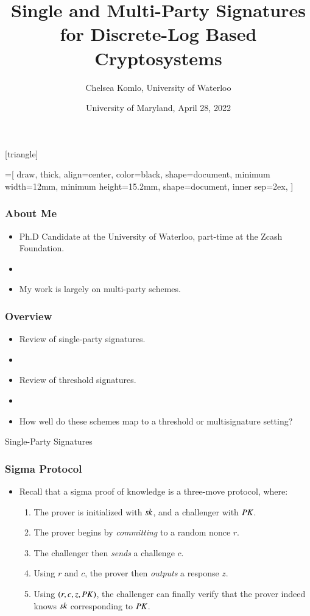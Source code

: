 \documentclass[hyperref={pdfpagelabels=true},table,dvipsnames,14pt,aspectratio=169]{beamer}
\title[Signatures for Discrete Logarithm Based Cryptosystems]{Single and Multi-Party Signatures for Discrete-Log Based Cryptosystems}
\author{Chelsea Komlo, University of Waterloo}
\date[April 2022]{ University of Maryland, April 28, 2022}
\begin{document}
[triangle]

=[%
draw,
thick,
align=center,
color=black,
shape=document,
minimum width=12mm,
minimum height=15.2mm,
shape=document,
inner sep=2ex,
]

\begin{frame}
        \thispagestyle{empty}
        \maketitle
\end{frame}

\begin{frame}
  \frametitle{About Me}

  \begin{itemize}
    \item<1-> Ph.D Candidate at the University of Waterloo, part-time at the Zcash Foundation. 
    \item[]
    \item<1-> My work is largely on multi-party schemes.  
  \end{itemize}
\end{frame}

\begin{frame}
  \frametitle{Overview}

  \begin{itemize}
    \item<1-> Review of single-party signatures.
    \item[]
    \item<2-> Review of threshold signatures. 
    \item[]
    \item<3-> How well do these schemes map to a threshold or multisignature setting? 
  \end{itemize}
\end{frame}

\begin{frame}
  \huge 
  Single-Party Signatures 
\end{frame}

\begin{frame}
  \frametitle{Sigma Protocol}

  \begin{itemize}
    \item<1-> Recall that a sigma proof of knowledge is a three-move protocol, where:
  \begin{enumerate}
	  \item<2->[1.] The prover is initialized with $\mathit{sk}$, and a challenger with $\mathit{PK}$. 
	  \item<3->[2.] The prover begins by \emph{committing} to a random nonce $r$. 
	  \item<4->[3.] The challenger then \emph{sends} a challenge $c$. 
	  \item<5->[4.] Using $r$ and $c$, the prover then \emph{outputs} a response $z$. 
	  \item<6->[5.] Using $(r, c,z, \mathit{PK})$, the challenger can finally verify that the prover indeed knows $\mathit{sk}$ corresponding to $\mathit{PK}$.
  \end{enumerate}
  \end{itemize}
\end{frame}
\end{document}
